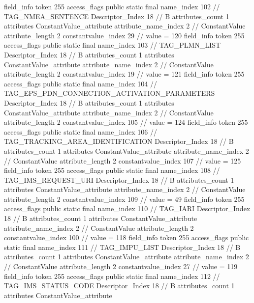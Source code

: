 {{{{{			}
			field_info {
				token	255
				access_flags	public static final
				name_index	102		// TAG_NMEA_SENTENCE
				Descriptor_Index	18		// B
				attributes_count	1
				attributes {
				ConstantValue_attribute {
					attribute_name_index	2		// ConstantValue
					attribute_length	2
					constantvalue_index	29		// value = 120
				}
				}
			}
			field_info {
				token	255
				access_flags	public static final
				name_index	103		// TAG_PLMN_LIST
				Descriptor_Index	18		// B
				attributes_count	1
				attributes {
				ConstantValue_attribute {
					attribute_name_index	2		// ConstantValue
					attribute_length	2
					constantvalue_index	19		// value = 121
				}
				}
			}
			field_info {
				token	255
				access_flags	public static final
				name_index	104		// TAG_EPS_PDN_CONNECTION_ACTIVATION_PARAMETERS
				Descriptor_Index	18		// B
				attributes_count	1
				attributes {
				ConstantValue_attribute {
					attribute_name_index	2		// ConstantValue
					attribute_length	2
					constantvalue_index	105		// value = 124
				}
				}
			}
			field_info {
				token	255
				access_flags	public static final
				name_index	106		// TAG_TRACKING_AREA_IDENTIFICATION
				Descriptor_Index	18		// B
				attributes_count	1
				attributes {
				ConstantValue_attribute {
					attribute_name_index	2		// ConstantValue
					attribute_length	2
					constantvalue_index	107		// value = 125
				}
				}
			}
			field_info {
				token	255
				access_flags	public static final
				name_index	108		// TAG_IMS_REQUEST_URI
				Descriptor_Index	18		// B
				attributes_count	1
				attributes {
				ConstantValue_attribute {
					attribute_name_index	2		// ConstantValue
					attribute_length	2
					constantvalue_index	109		// value = 49
				}
				}
			}
			field_info {
				token	255
				access_flags	public static final
				name_index	110		// TAG_IARI
				Descriptor_Index	18		// B
				attributes_count	1
				attributes {
				ConstantValue_attribute {
					attribute_name_index	2		// ConstantValue
					attribute_length	2
					constantvalue_index	100		// value = 118
				}
				}
			}
			field_info {
				token	255
				access_flags	public static final
				name_index	111		// TAG_IMPU_LIST
				Descriptor_Index	18		// B
				attributes_count	1
				attributes {
				ConstantValue_attribute {
					attribute_name_index	2		// ConstantValue
					attribute_length	2
					constantvalue_index	27		// value = 119
				}
				}
			}
			field_info {
				token	255
				access_flags	public static final
				name_index	112		// TAG_IMS_STATUS_CODE
				Descriptor_Index	18		// B
				attributes_count	1
				attributes {
				ConstantValue_attribute {
}}}}}}}
